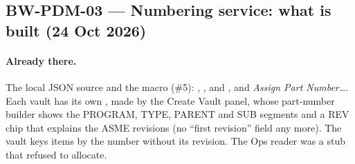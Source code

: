 \subsection{BW-PDM-03 --- Numbering service: what is built (24 Oct 2026)}\label{sec:pdm03}

\paragraph{Already there.} The local JSON source and the macro (\#5): , ,
 and , and \emph{Assign Part Number\ldots}. Each vault has its own ,
made by the Create Vault panel, whose part-number builder shows the PROGRAM, TYPE, PARENT and SUB segments and a REV
chip that explains the ASME revisions (no ``first revision'' field any more). The vault keys items by the number
without its revision. The Ops reader was a stub that refused to allocate.

